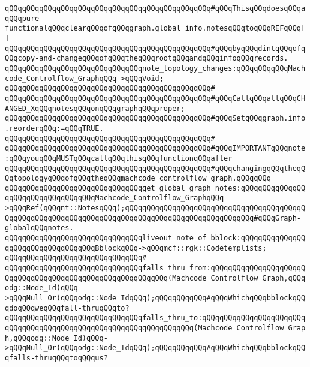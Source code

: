 \verb|qQQqqQQqqQQqqQQqqQQqqQQqqQQqqQQqqQQqqQQqqQQqqQQq#qQQqThisqQQqdoesqQQqaqQQqpure-functionalqQQqclearqQQqofqQQqgraph.global_info.notesqQQqtoqQQqREFqQQq[]|\newline
\verb|qQQqqQQqqQQqqQQqqQQqqQQqqQQqqQQqqQQqqQQqqQQqqQQq#qQQqbyqQQqdintqQQqofqQQqcopy-and-changeqQQqofqQQqtheqQQqrootqQQqandqQQqinfoqQQqrecords.|\newline
\newline
\verb|qQQqqQQqqQQqqQQqqQQqqQQqqQQqqQQqnote_topology_changes:qQQqqQQqqQQqMachcode_Controlflow_GraphqQQq->qQQqVoid;|\newline
\verb|qQQqqQQqqQQqqQQqqQQqqQQqqQQqqQQqqQQqqQQqqQQqqQQq#|\newline
\verb|qQQqqQQqqQQqqQQqqQQqqQQqqQQqqQQqqQQqqQQqqQQqqQQq#qQQqCallqQQqallqQQqCHANGED_XqQQqnotesqQQqonqQQqgraphqQQqproper;|\newline
\verb|qQQqqQQqqQQqqQQqqQQqqQQqqQQqqQQqqQQqqQQqqQQqqQQq#qQQqSetqQQqgraph.info.reorderqQQq:=qQQqTRUE.|\newline
\verb|qQQqqQQqqQQqqQQqqQQqqQQqqQQqqQQqqQQqqQQqqQQqqQQq#|\newline
\verb|qQQqqQQqqQQqqQQqqQQqqQQqqQQqqQQqqQQqqQQqqQQqqQQq#qQQqIMPORTANTqQQqnote:qQQqyouqQQqMUSTqQQqcallqQQqthisqQQqfunctionqQQqafter|\newline
\verb|qQQqqQQqqQQqqQQqqQQqqQQqqQQqqQQqqQQqqQQqqQQqqQQq#qQQqchangingqQQqtheqQQqtopologyqQQqofqQQqtheqQQqmachcode_controlflow_graph.qQQqqQQq|\newline
\newline
\verb|qQQqqQQqqQQqqQQqqQQqqQQqqQQqqQQqget_global_graph_notes:qQQqqQQqqQQqqQQqqQQqqQQqqQQqqQQqqQQqMachcode_Controlflow_GraphqQQq->qQQqRef(qQQqnt::NotesqQQq);qQQqqQQqqQQqqQQqqQQqqQQqqQQqqQQqqQQqqQQqqQQqqQQqqQQqqQQqqQQqqQQqqQQqqQQqqQQqqQQqqQQqqQQqqQQqqQQqqQQq#qQQqGraph-globalqQQqnotes.|\newline
\verb|qQQqqQQqqQQqqQQqqQQqqQQqqQQqqQQqliveout_note_of_bblock:qQQqqQQqqQQqqQQqqQQqqQQqqQQqqQQqqQQqBblockqQQq->qQQqmcf::rgk::Codetemplists;|\newline
\verb|qQQqqQQqqQQqqQQqqQQqqQQqqQQqqQQq#|\newline
\verb|qQQqqQQqqQQqqQQqqQQqqQQqqQQqqQQqfalls_thru_from:qQQqqQQqqQQqqQQqqQQqqQQqqQQqqQQqqQQqqQQqqQQqqQQqqQQqqQQqqQQq(Machcode_Controlflow_Graph,qQQqodg::Node_Id)qQQq->qQQqNull_Or(qQQqodg::Node_IdqQQq);qQQqqQQqqQQq#qQQqWhichqQQqbblockqQQqdoqQQqweqQQqfall-thruqQQqto?|\newline
\verb|qQQqqQQqqQQqqQQqqQQqqQQqqQQqqQQqfalls_thru_to:qQQqqQQqqQQqqQQqqQQqqQQqqQQqqQQqqQQqqQQqqQQqqQQqqQQqqQQqqQQqqQQqqQQq(Machcode_Controlflow_Graph,qQQqodg::Node_Id)qQQq->qQQqNull_Or(qQQqodg::Node_IdqQQq);qQQqqQQqqQQq#qQQqWhichqQQqbblockqQQqfalls-thruqQQqtoqQQqus?|\newline
